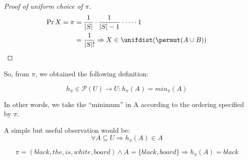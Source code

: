     \begin{proof}[Proof of uniform choice of $\pi$]
        \begin{align*}
        \Pr{X = \pi} &= \frac{1}{|S|}\cdot\frac{1}{|S|-1}\cdot\dots\cdot 1\\
        &= \frac{1}{|S|!} \Rightarrow X \in \unifdist(\permut(A \cup B))
        \end{align*}
    \end{proof}
	
	So, from $\pi$, we obtained the following definition:
    \begin{defn}
        \begin{equation}
        h_\pi \in \mathcal{P}(U) \to U : h_\pi(A) = min_\pi(A)
        \end{equation}
    \end{defn}
	
	In other words, we take the ``minimum'' in A according to the ordering specified by $\pi$.
    
    \begin{obs}
        A simple but useful observation would be:
        \begin{equation}
        \forall A \subseteq U \Rightarrow h_\pi(A) \in A
        \end{equation}
    \end{obs}
	
	\begin{ex}
       	\begin{equation*}
            \pi = (black, the, is, white, board) \wedge A = \{black, board\} \Rightarrow h_\pi(A) = black
        \end{equation*}
    \end{ex}
	
